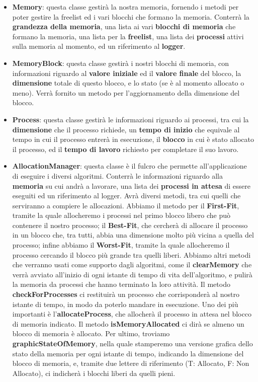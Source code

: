 \documentclass[20pt,a4paper,oneside]{article}
\begin{document}
\begin{itemize}
\item \textbf{Memory}: questa classe gestirà la nostra memoria, fornendo i metodi per poter gestire la freelist ed i vari blocchi
che formano la memoria. Conterrà la \textbf{grandezza della memoria}, una lista ai vari \textbf{blocchi di memoria} che formano la memoria,
una lista per la \textbf{freelist}, una lista dei \textbf{processi} attivi sulla memoria al momento, ed un riferimento al \textbf{logger}.

\item \textbf{MemoryBlock}: questa classe gestirà i nostri blocchi di memoria, con informazioni riguardo al \textbf{valore iniziale} ed il \textbf{valore finale} del blocco,
la \textbf{dimensione} totale di questo blocco, e lo stato (se è al momento allocato o meno). Verrà fornito un metodo per l'aggiornamento della dimensione
del blocco.

\item \textbf{Process}: questa classe gestirà le informazioni riguardo ai processi, tra cui la \textbf{dimensione} che il processo richiede, un \textbf{tempo di inizio} che equivale al tempo in cui il processo entrerà in esecuzione, il \textbf{blocco} in cui è stato allocato il processo, ed il \textbf{tempo di lavoro} richiesto per completare il suo lavoro.

\item \textbf{AllocationManager}: questa classe è il fulcro che permette all'applicazione di eseguire i diversi algoritmi. Conterrà le informazioni riguardo alla \textbf{memoria} su cui andrà a lavorare, una lista dei \textbf{processi in attesa} di essere eseguiti ed un riferimento al logger. Avrà diversi metodi, tra cui quelli che serviranno a compiere le allocazioni. Abbiamo il metodo per il \textbf{First-Fit}, tramite la quale allocheremo i processi nel primo blocco libero che può contenere il nostro processo; il \textbf{Best-Fit}, che cercherà di allocare il processo in un blocco che, tra tutti, abbia una dimensione molto più vicina a quella del processo; infine abbiamo il \textbf{Worst-Fit}, tramite la quale allocheremo il processo cercando il blocco più grande tra quelli liberi. Abbiamo altri metodi che verranno usati come supporto dagli algoritmi, come il \textbf{clearMemory} che verrà avviato all'inizio di ogni istante di tempo di vita dell'algoritmo, e pulirà la memoria da processi che hanno terminato la loro attività. Il metodo \textbf{checkForProcesses} ci restituirà un processo che corrisponderà al nostro istante di tempo, in modo da poterlo mandare in esecuzione. Uno dei più importanti è l'\textbf{allocateProcess}, che allocherà il processo in attesa nel blocco di memoria indicato. Il metodo \textbf{isMemoryAllocated} ci dirà se almeno un blocco di memoria è allocato. Per ultimo, troviamo \textbf{graphicStateOfMemory}, nella quale stamperemo una versione grafica dello stato della memoria per ogni istante di tempo, indicando la dimensione del blocco di memoria, e, tramite due lettere di riferimento (T: Allocato, F: Non Allocato), ci indicherà i blocchi liberi da quelli pieni.
\end{itemize}
\end{document}
